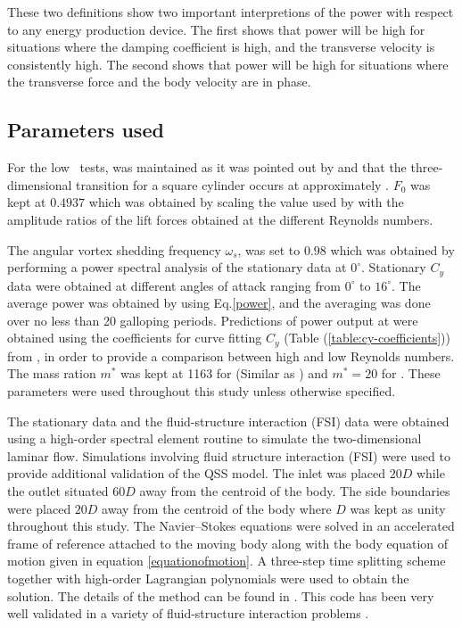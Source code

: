 These two definitions show two important interpretions of the power with respect to any energy production device. The first shows that power will be high for situations where the damping coefficient is high, and the transverse velocity is consistently high. The second shows that power will be high for situations where the transverse force and the body velocity are in phase.
 
 

 
 
\subsection{Parameters used} 
 
For the low \reynoldsnumber\ tests,  was maintained as it was pointed out by \citet{Sheard2009} and \citet{Tong2008} that the three-dimensional transition for a square cylinder occurs at approximately . $F_0$ was kept at $0.4937$ which was obtained by scaling the value used by \citet{Joly2012} with the amplitude ratios of the lift forces obtained at the different Reynolds numbers. 

The angular vortex shedding frequency $\omega_s$, was set to $0.98$ which was obtained by performing a power spectral analysis of the stationary data at $0^\circ$. Stationary $C_y$ data were obtained at different angles of attack ranging from $0^\circ$ to $16^\circ$. The average power was obtained by using Eq.\eqref{power}, and the averaging was done over no less than 20 galloping periods. Predictions of power output at  were obtained using the coefficients for curve fitting $C_y$ (Table (\ref{table:cy-coefficients})) from \citet{Parkinson1964}, in order to provide a comparison between high and low Reynolds numbers. The mass ration $m^*$ was kept at 1163 for  (Similar as \citet{Parkinson1964}) and $m^*=20$ for . These parameters were used throughout this study unless otherwise specified. 

The stationary data and the fluid-structure interaction (FSI) data were obtained using a high-order spectral element routine to simulate the two-dimensional laminar flow.  Simulations involving fluid structure interaction (FSI) were used to provide additional validation of the QSS model. The inlet was placed $20D$ while the outlet situated $60D$ away from the centroid of the body. The side boundaries were placed $20D$ away from the centroid of the body where $D$ was kept as unity throughout this study. The Navier--Stokes equations were solved in an accelerated frame of reference attached to the moving body along with the body equation of motion given in equation \ref{equationofmotion}. A three-step time splitting scheme together with high-order Lagrangian polynomials were used to obtain the solution. The details of the method can be found in \cite{Thompson2006,Thompson1996a}. This code has been very well validated in a variety of fluid-structure interaction problems \citep{Leontini2007a,Griffith2011,Leontini2011,Leontini2013}.
 
